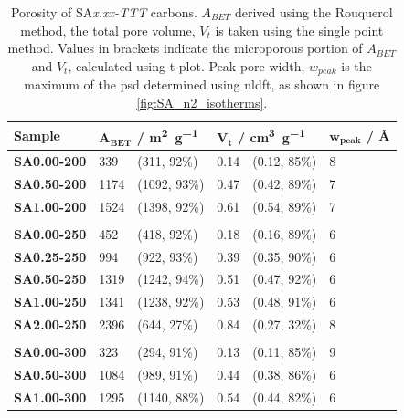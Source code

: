 \begin{table}[b!]
    \centering
    \caption{Porosity of SA\textit{x.xx-TTT} carbons. $A_{BET}$ derived using the Rouquerol method, the total pore volume, $V_t$ is taken using the single point method. Values in brackets indicate the microporous portion of $A_{BET}$ and $V_t$, calculated using t-plot. Peak pore width, $w_{peak}$ is the maximum of the \acrshort{psd} determined using \acrshort{nldft}, as shown in figure \ref{fig:SA_n2_isotherms}.}
    \label{tb:sa_porosity}
    \begin{tabularx}{0.9\textwidth}{lllllll}
    \toprule
        \textbf{Sample} & \multicolumn{2}{l}{$\mathbf{A_{BET}}$ \textbf{/ \unit[detect-weight]{\metre\squared\per\gram}}}  & \multicolumn{2}{l}{$\mathbf{V_t}$ \textbf{/ \unit[detect-weight]{\cm\cubed\per\gram}}} & \multicolumn{2}{l}{$\mathbf{w_{peak}}$ \textbf{/ \unit{\angstrom}}} \\
    \midrule
        \textbf{SA0.00-200} & 339 & (311, 92\%) & 0.14 & (0.12, 85\%) & 8 \\
        \textbf{SA0.50-200} & 1174 & (1092, 93\%) & 0.47 & (0.42, 89\%) & 7 \\
        \textbf{SA1.00-200} & 1524 & (1398, 92\%) & 0.61 & (0.54, 89\%) & 7 \\
        \\
        \textbf{SA0.00-250} & 452 & (418, 92\%) & 0.18 & (0.16, 89\%) & 6 \\
        \textbf{SA0.25-250} & 994 & (922, 93\%) & 0.39 & (0.35, 90\%) & 6 \\
        \textbf{SA0.50-250} & 1319 & (1242, 94\%) & 0.51 & (0.47, 92\%) & 6 \\
        \textbf{SA1.00-250} & 1341 & (1238, 92\%) & 0.53 & (0.48, 91\%) & 6 \\
        \textbf{SA2.00-250} & 2396 & (644, 27\%) & 0.84 & (0.27, 32\%) & 8 \\
        \\
        \textbf{SA0.00-300} & 323 & (294, 91\%) & 0.13 & (0.11, 85\%) & 9 \\
        \textbf{SA0.50-300} & 1084 & (989, 91\%) & 0.44 & (0.38, 86\%) & 6 \\
        \textbf{SA1.00-300} & 1295 & (1140, 88\%) & 0.54 & (0.44, 82\%) & 6 \\
    \bottomrule
    \end{tabularx}
\end{table}

